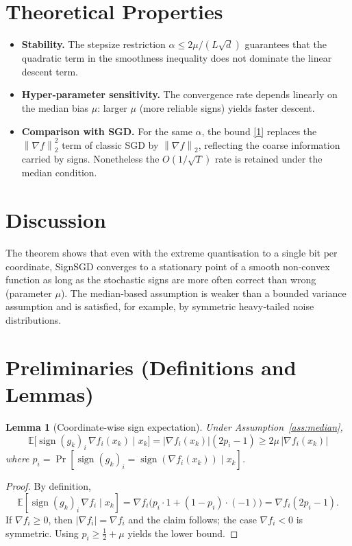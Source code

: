 \documentclass{article}
\newtheorem{lemma}{Lemma}
\newcommand{\sign}{\operatorname{sign}}
\newcommand{\E}{\mathbb{E}}
\newcommand{\norm}[1]{\left\lVert#1\right\rVert}
\begin{document}
\section*{Theoretical Properties}
\begin{itemize}
\item \textbf{Stability.} The stepsize restriction $\alpha\le 2\mu/(L\sqrt d)$ guarantees that the
quadratic term in the smoothness inequality does not dominate the linear descent term.
\item \textbf{Hyper‑parameter sensitivity.} The convergence rate depends linearly on the
median bias $\mu$: larger $\mu$ (more reliable signs) yields faster descent.
\item \textbf{Comparison with SGD.} For the same $\alpha$, the bound \eqref{1} replaces the
$\norm{\nabla f}_2^2$ term of classic SGD by $\norm{\nabla f}_2$, reflecting the coarse
information carried by signs. Nonetheless the $O(1/\sqrt{T})$ rate is retained under the
median condition.
\end{itemize}

\section*{Discussion}
The theorem shows that even with the extreme quantisation to a single bit per coordinate,
SignSGD converges to a stationary point of a smooth non‑convex function as long as the
stochastic signs are more often correct than wrong (parameter $\mu$).  The median‑based
assumption is weaker than a bounded variance assumption and is satisfied, for example,
by symmetric heavy‑tailed noise distributions.

\newpage
\section*{Preliminaries (Definitions and Lemmas)}
\begin{lemma}[Coordinate‑wise sign expectation]\label{lem:signexp}
Under Assumption~\ref{ass:median},
\[
\E\!\bigl[\sign(g_k)_i\,\nabla f_i(x_k)\mid x_k\bigr]
=|\nabla f_i(x_k)|(2p_i-1)\ge 2\mu\,|\nabla f_i(x_k)|
\]
where $p_i=\Pr[\sign(g_k)_i=\sign(\nabla f_i(x_k))\mid x_k]$.
\end{lemma}
\begin{proof}
By definition,
\[
\E[\sign(g_k)_i\,\nabla f_i\mid x_k]
= \nabla f_i\bigl(p_i\cdot 1 + (1-p_i)\cdot(-1)\bigr)
= \nabla f_i(2p_i-1).
\]
If $\nabla f_i\ge0$, then $|\nabla f_i|=\nabla f_i$ and the claim follows; the case
$\nabla f_i<0$ is symmetric.  Using $p_i\ge\tfrac12+\mu$ yields the lower bound.
\end{proof}
\end{document}
